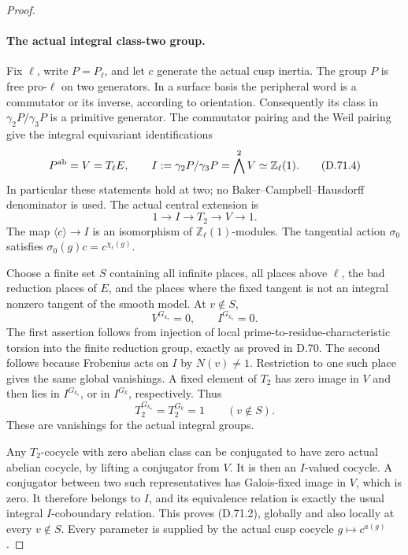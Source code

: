 \begin{proof}
\paragraph{The actual integral class-two group.}
Fix \(\ell\), write \(P=P_\ell\), and let \(c\)
generate the actual cusp inertia. The group \(P\)
is free pro-\(\ell\) on two generators. In a
surface basis the peripheral word is a commutator
or its inverse, according to orientation.
Consequently its class in
\(\gamma_2P/\gamma_3P\) is a primitive generator.
The commutator pairing and the Weil pairing give
the integral equivariant identifications
\[
 P^{\rm ab}=V=T_\ell E,\qquad
 I:=\gamma_2P/\gamma_3P
       =\bigwedge^2 V\simeq\mathbb Z_\ell(1).
                                                        \tag{D.71.4}
\]
In particular these statements hold at two; no
Baker--Campbell--Hausdorff denominator is used.
The actual central extension is
\[
 1\longrightarrow I\longrightarrow T_2
                     \longrightarrow V\longrightarrow1.
                                                        \tag{D.71.5}
\]
The map \(\langle c\rangle\to I\) is an isomorphism
of \(\mathbb Z_\ell(1)\)-modules. The tangential
action \(\sigma_0\) satisfies
\(\sigma_0(g)c=c^{\chi_\ell(g)}\).

Choose a finite set \(S\) containing all infinite
places, all places above \(\ell\), the bad
reduction places of \(E\), and the places where
the fixed tangent is not an integral nonzero
tangent of the smooth model. At \(v\notin S\),
\[
             V^{G_{k_v}}=0,\qquad I^{G_{k_v}}=0.
                                                        \tag{D.71.6}
\]
The first assertion follows from injection of
local prime-to-residue-characteristic torsion
into the finite reduction group, exactly as
proved in D.70. The second follows because
Frobenius acts on \(I\) by \(N(v)\ne1\).
Restriction to one such place gives the same
global vanishings. A fixed element of \(T_2\)
has zero image in \(V\) and then lies in
\(I^{G_{k_v}}\), or in \(I^{G_k}\), respectively.
Thus
\[
             T_2^{G_{k_v}}=T_2^{G_k}=1
                         \qquad(v\notin S).             \tag{D.71.7}
\]
These are vanishings for the actual integral
groups.

Any \(T_2\)-cocycle with zero abelian class
can be conjugated to have zero actual abelian
cocycle, by lifting a conjugator from \(V\).
It is then an \(I\)-valued cocycle. A conjugator
between two such representatives has
Galois-fixed image in \(V\), which is zero.
It therefore belongs to \(I\), and its
equivalence relation is exactly the usual
integral \(I\)-coboundary relation. This
proves (D.71.2), globally and also locally
at every \(v\notin S\). Every parameter is
supplied by the actual cusp cocycle
\(g\mapsto c^{a(g)}\).


\end{proof}
